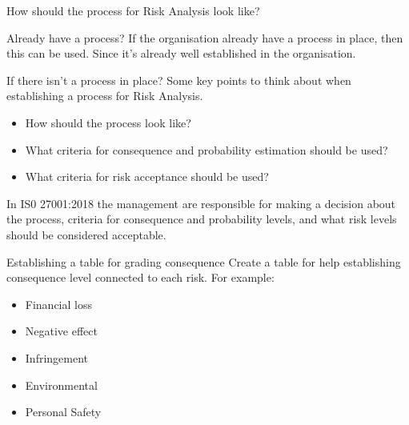 \documentclass{beamer}
\begin{document}
\begin{frame}{How should the process for Risk Analysis look like?}
  \begin{block}{Already have a process?}
    If the organisation already have a process in place, then this can be used.
    Since it's already well established in the organisation.
  \end{block} 
  \begin{block}{If there isn't a process in place?}
    Some key points to think about when establishing a process for Risk
    Analysis.
    \begin{itemize}
      \item How should the process look like?
      \item What criteria for consequence and probability estimation should be
        used?
      \item What criteria for risk acceptance should be used?
      \end{itemize}
      In IS0 27001:2018 the management are responsible for making a decision
      about the process, criteria for consequence and probability levels, and
      what risk levels should be considered acceptable. 
  \end{block}
\end{frame}
\begin{frame}{Establishing a table for grading consequence}
  Create a table for help establishing consequence level connected to each risk.
  For example:
  \begin{itemize}
    \item Financial loss
    \item Negative effect
    \item Infringement
    \item Environmental
    \item Personal Safety
  \end{itemize}
\end{frame}
\end{document}
